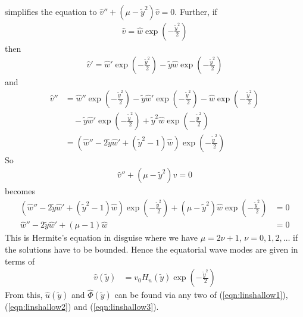 \begin{solution}
\begin{align*}
\end{align*}
simplifies the equation to $\hat{v}'' + (\mu - \tilde{y}^2)\hat{v} = 0$. Further, if
\begin{align*}
\hat{v} = \hat{w} \exp(-\frac{\tilde{y}^2}{2})
\end{align*}
then 
\begin{align*}
\hat{v}' = \hat{w}' \exp(-\frac{\tilde{y}^2}{2}) - \tilde{y}\hat{w} \exp(-\frac{\tilde{y}^2}{2})
\end{align*}
and
\begin{align*}
\hat{v}'' &= \hat{w}'' \exp(-\frac{\tilde{y}^2}{2}) - \tilde{y}\hat{w}' \exp(-\frac{\tilde{y}^2}{2}) - \hat{w} \exp(-\frac{\tilde{y}^2}{2}) \\
&\quad - \tilde{y}\hat{w}' \exp(-\frac{\tilde{y}^2}{2}) + \tilde{y}^2\hat{w} \exp(-\frac{\tilde{y}^2}{2}) \\
&= (\hat{w}'' - 2\tilde{y}\hat{w}' + (\tilde{y}^2-1)\hat{w})\exp(-\frac{\tilde{y}^2}{2})
\end{align*}
So
\begin{align*}
\hat{v}'' + (\mu - \tilde{y}^2)\hat{v} = 0
\end{align*}
becomes
\begin{align*}
(\hat{w}'' - 2\tilde{y}\hat{w}' + (\tilde{y}^2-1)\hat{w})\exp(-\frac{\tilde{y}^2}{2}) + (\mu - \tilde{y}^2)\hat{w} \exp(-\frac{\tilde{y}^2}{2}) &= 0 \\
\hat{w}'' - 2\tilde{y}\hat{w}' + (\mu-1)\hat{w} &= 0
\end{align*}
This is Hermite's equation in disguise where we have $\mu = 2\nu + 1$, $\nu = 0, 1, 2, \ldots$ if the solutions have to be bounded. Hence the equatorial wave modes are given in terms of
\begin{align*}
\hat{v}(\tilde{y}) &= v_0H_n(\tilde{y})\exp(-\frac{\tilde{y}^2}{2})    
\end{align*}
From this, $\hat{u}(\tilde{y})$ and $\hat{\Phi}(\tilde{y})$ can be found via any two of (\ref{eqn:linshallow1}), (\ref{eqn:linshallow2}) and (\ref{eqn:linshallow3}).

\end{solution}
